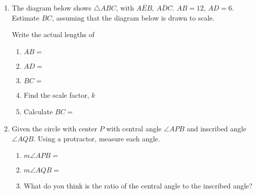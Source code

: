 \documentclass[12pt, twoside]{article}
\begin{document}
\begin{enumerate}
\item The diagram below shows $\triangle ABC$, with $\overline{AEB}$, $\overline{ADC}$. $AB=12$, $AD=6$. Estimate $BC$, assuming that the diagram below is drawn to scale.
  \begin{multicols}{2}
    Write the actual lengths of 
    \begin{enumerate}
      \item $AB=$ \vspace{0.7cm}
      \item $AD=$ \vspace{0.7cm}
      \item $BC=$  \vspace{0.7cm}
      \item Find the scale factor, $k$ \vspace{1.2cm}
      \item Calculate $BC=$
    \end{enumerate}
    \end{multicols}\vspace{2cm}

\item Given the circle with center $P$ with central angle $\angle APB$ and inscribed angle $\angle AQB$. Using a protractor, measure each angle.
  \begin{multicols}{2}
    \raggedcolumns
    \begin{enumerate}
      \item $m\angle APB=$ \vspace{0.7cm}
      \item $m\angle AQB=$ \vspace{0.7cm}
      \item What do you think is the ratio of the central angle to the inscribed angle?
    \end{enumerate}
  \end{multicols}


\end{enumerate}
\end{document}
